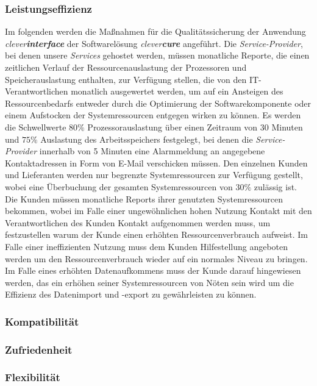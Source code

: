 \subsubsection{Leistungseffizienz}
\label{sec:quality-qualtity-ensurement-openTrans}
Im folgenden werden die Maßnahmen für die Qualitätssicherung der Anwendung \emph{clever\textbf{interface}} der Softwarelösung \emph{clever\textbf{cure}} angeführt.
\newline
\newline
Die \emph{Service-Provider}, bei denen unsere \emph{Services} gehostet werden, müssen monatliche Reporte, die einen zeitlichen Verlauf der Ressourcenauslastung der Prozessoren und Speicherauslastung enthalten, zur Verfügung stellen, die von den IT-Verantwortlichen monatlich ausgewertet werden, um auf ein Ansteigen des Ressourcenbedarfs entweder durch die Optimierung der Softwarekomponente oder einem Aufstocken der Systemressourcen entgegen wirken zu können.
\newline
\newline
Es werden die Schwellwerte $80\%$ Prozessorauslastung über einen Zeitraum von 30 Minuten und $75\%$ Auslastung des Arbeitsspeichers festgelegt, bei denen die \emph{Service-Provider} innerhalb von 5 Minuten eine Alarmmeldung an angegebene Kontaktadressen in Form von E-Mail verschicken müssen. 
\newline
\newline
Den einzelnen Kunden und Lieferanten werden nur begrenzte Systemressourcen zur Verfügung gestellt, wobei eine Überbuchung der gesamten Systemressourcen von $30\%$ zulässig ist. 
\newline
\newline
Die Kunden müssen monatliche Reports ihrer genutzten Systemressourcen bekommen, wobei im Falle einer ungewöhnlichen hohen Nutzung Kontakt mit den Verantwortlichen des Kunden Kontakt aufgenommen werden muss, um festzustellen warum der Kunde einen erhöhten Ressourcenverbrauch aufweist. Im Falle einer ineffizienten Nutzung muss dem Kunden Hilfestellung angeboten werden um den Ressourcenverbrauch wieder auf ein normales Niveau zu bringen. Im Falle eines erhöhten Datenaufkommens muss der Kunde darauf hingewiesen werden, das ein erhöhen seiner Systemressourcen von Nöten sein wird um die Effizienz des Datenimport und -export zu gewährleisten zu können.  

\subsubsection{Kompatibilität}
\subsubsection{Zufriedenheit}
\subsubsection{Flexibilität}



